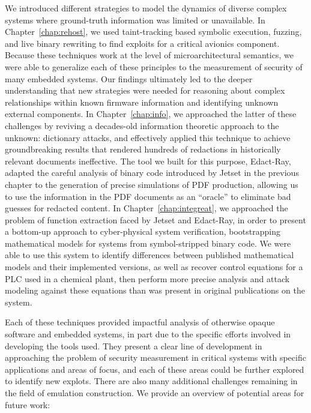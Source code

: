 We introduced different strategies to model the dynamics of diverse complex systems where ground-truth information was limited or unavailable.
In Chapter~\ref{chap:rehost}, we used taint-tracking based symbolic execution, fuzzing, and live binary rewriting to find exploits for a critical avionics component.
Because these techniques work at the level of microarchitectural semantics, we were able to generalize each of these principles to the measurement of security of many embedded systems.
Our findings ultimately led to the deeper understanding that new strategies were needed for reasoning about complex relationships within known firmware information and identifying unknown external components.
In Chapter~\ref{chap:info}, we approached the latter of these challenges by reviving a decades-old information theoretic approach to the unknown: dictionary attacks, and effectively applied this technique to achieve groundbreaking results that rendered hundreds of redactions in historically relevant documents ineffective.
The tool we built for this purpose, Edact-Ray, adapted the careful analysis of binary code introduced by Jetset in the previous chapter to the generation of precise simulations of PDF production, allowing us to use the information in the PDF documents as an ``oracle'' to eliminate bad guesses for redacted content.
In Chapter~\ref{chap:integreat}, we approached the problem of function extraction faced by Jetset and Edact-Ray, in order to present a bottom-up approach to cyber-physical system verification, bootstrapping mathematical models for systems from symbol-stripped binary code.
We were able to use this system to identify differences between published mathematical models and their implemented versions, as well as recover control equations for a PLC used in a chemical plant, then perform more precise analysis and attack modeling against these equations than was present in original publications on the system.

Each of these techniques provided impactful analysis of otherwise opaque software and embedded systems, in part due to the specific efforts involved in developing the tools used.
They present a clear line of development in approaching the problem of security measurement in critical systems with specific applications and areas of focus, and each of these areas could be further explored to identify new explots.
There are also many additional challenges remaining in the field of emulation construction.
We provide an overview of potential areas for future work:

